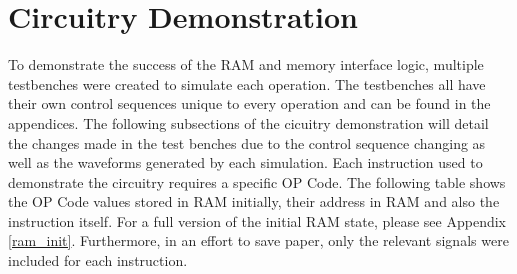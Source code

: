 \documentclass{article}
\begin{document}
\section{Circuitry Demonstration}
    To demonstrate the success of the RAM and memory interface logic, multiple testbenches were created to simulate each operation.  The testbenches all have their own control sequences unique to every operation and can be found in the appendices. The following subsections of the cicuitry demonstration will detail the changes made in the test benches due to the control sequence changing as well as the waveforms generated by each simulation. Each instruction used to demonstrate the circuitry requires a specific OP Code. The following table shows the OP Code values stored in RAM initially, their address in RAM and also the instruction itself. For a full version of the initial RAM state, please see Appendix \ref{ram_init}. Furthermore, in an effort to save paper, only the relevant signals were included for each instruction.
\end{document}
